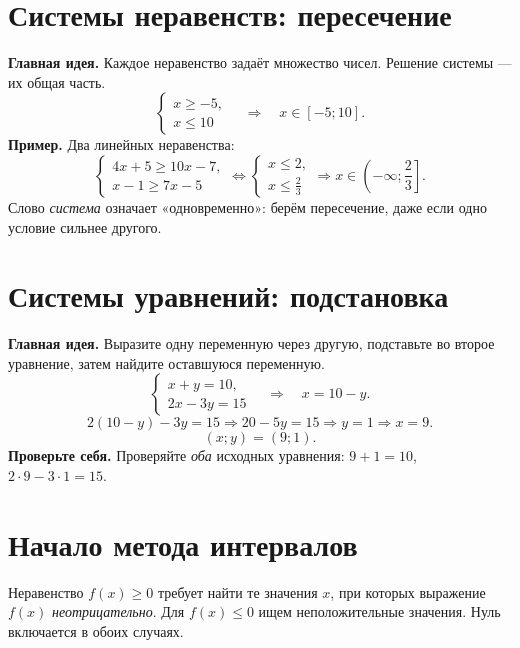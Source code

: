 \documentclass[a4paper,12pt]{article}
\newcommand{\idea}[1]{\textcolor{darkaccent}{\textbf{Главная идея.}} #1}
\newcommand{\attention}[1]{\textcolor{darkaccent}{\textbf{Проверьте себя.}} #1}
\newcommand{\ex}[1]{\textcolor{darkaccent}{\textbf{Пример.}} #1}
\begin{document}
\section{Системы неравенств: пересечение}
\idea{Каждое неравенство задаёт множество чисел. Решение системы --- их общая часть.}
\[
\begin{cases}
x\ge-5,\\
x\le10
\end{cases}
\quad\Longrightarrow\quad x\in[-5;10].
\]
\ex{Два линейных неравенства:}
\[
\begin{cases}
4x+5\ge10x-7,\\
x-1\ge7x-5
\end{cases}
\Longleftrightarrow
\begin{cases}
x\le2,\\
x\le\frac23
\end{cases}
\Longrightarrow\boxed{x\in\left(-\infty;\frac23\right]}.
\]
Слово \emph{система} означает «одновременно»: берём пересечение, даже если одно условие сильнее другого.

\section{Системы уравнений: подстановка}
\idea{Выразите одну переменную через другую, подставьте во второе уравнение, затем найдите оставшуюся переменную.}
\[
\begin{cases}x+y=10,\\2x-3y=15\end{cases}
\quad\Longrightarrow\quad x=10-y.
\]
\[
2(10-y)-3y=15\Longrightarrow20-5y=15
\Longrightarrow y=1\Longrightarrow x=9.
\]
\[
\boxed{(x;y)=(9;1)}.
\]
\attention{Проверяйте \emph{оба} исходных уравнения: \(9+1=10\), \(2\cdot9-3\cdot1=15\).}

\clearpage
\section{Начало метода интервалов}
Неравенство \(f(x)\ge0\) требует найти те значения \(x\), при которых выражение \(f(x)\) \emph{неотрицательно}. Для \(f(x)\le0\) ищем неположительные значения. Нуль включается в обоих случаях.
\end{document}
